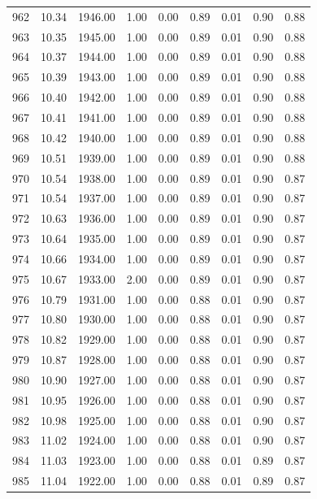 \documentclass{article}\usepackage[]{graphicx}\usepackage[]{color}
\begin{document}
\begin{longtable}{rrrrrrrrr}
  962 & 10.34 & 1946.00 & 1.00 & 0.00 & 0.89 & 0.01 & 0.90 & 0.88 \\ 
  963 & 10.35 & 1945.00 & 1.00 & 0.00 & 0.89 & 0.01 & 0.90 & 0.88 \\ 
  964 & 10.37 & 1944.00 & 1.00 & 0.00 & 0.89 & 0.01 & 0.90 & 0.88 \\ 
  965 & 10.39 & 1943.00 & 1.00 & 0.00 & 0.89 & 0.01 & 0.90 & 0.88 \\ 
  966 & 10.40 & 1942.00 & 1.00 & 0.00 & 0.89 & 0.01 & 0.90 & 0.88 \\ 
  967 & 10.41 & 1941.00 & 1.00 & 0.00 & 0.89 & 0.01 & 0.90 & 0.88 \\ 
  968 & 10.42 & 1940.00 & 1.00 & 0.00 & 0.89 & 0.01 & 0.90 & 0.88 \\ 
  969 & 10.51 & 1939.00 & 1.00 & 0.00 & 0.89 & 0.01 & 0.90 & 0.88 \\ 
  970 & 10.54 & 1938.00 & 1.00 & 0.00 & 0.89 & 0.01 & 0.90 & 0.87 \\ 
  971 & 10.54 & 1937.00 & 1.00 & 0.00 & 0.89 & 0.01 & 0.90 & 0.87 \\ 
  972 & 10.63 & 1936.00 & 1.00 & 0.00 & 0.89 & 0.01 & 0.90 & 0.87 \\ 
  973 & 10.64 & 1935.00 & 1.00 & 0.00 & 0.89 & 0.01 & 0.90 & 0.87 \\ 
  974 & 10.66 & 1934.00 & 1.00 & 0.00 & 0.89 & 0.01 & 0.90 & 0.87 \\ 
  975 & 10.67 & 1933.00 & 2.00 & 0.00 & 0.89 & 0.01 & 0.90 & 0.87 \\ 
  976 & 10.79 & 1931.00 & 1.00 & 0.00 & 0.88 & 0.01 & 0.90 & 0.87 \\ 
  977 & 10.80 & 1930.00 & 1.00 & 0.00 & 0.88 & 0.01 & 0.90 & 0.87 \\ 
  978 & 10.82 & 1929.00 & 1.00 & 0.00 & 0.88 & 0.01 & 0.90 & 0.87 \\ 
  979 & 10.87 & 1928.00 & 1.00 & 0.00 & 0.88 & 0.01 & 0.90 & 0.87 \\ 
  980 & 10.90 & 1927.00 & 1.00 & 0.00 & 0.88 & 0.01 & 0.90 & 0.87 \\ 
  981 & 10.95 & 1926.00 & 1.00 & 0.00 & 0.88 & 0.01 & 0.90 & 0.87 \\ 
  982 & 10.98 & 1925.00 & 1.00 & 0.00 & 0.88 & 0.01 & 0.90 & 0.87 \\ 
  983 & 11.02 & 1924.00 & 1.00 & 0.00 & 0.88 & 0.01 & 0.90 & 0.87 \\ 
  984 & 11.03 & 1923.00 & 1.00 & 0.00 & 0.88 & 0.01 & 0.89 & 0.87 \\ 
  985 & 11.04 & 1922.00 & 1.00 & 0.00 & 0.88 & 0.01 & 0.89 & 0.87 \\ 

\end{longtable}
\end{document}
